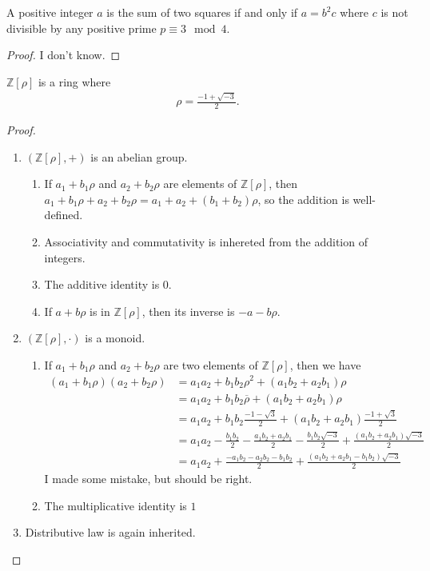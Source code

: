 \begin{example}
    A positive integer \(a\) is the sum of two squares if and only if \(a = b^2 c\) where \(c\) is not divisible by any positive prime \(p \equiv 3 \mod{4}\).
\end{example}
\begin{proof}
    I don't know.
\end{proof}

\begin{example}
    \(\mathbb{Z}[\rho]\) is a ring where
    \begin{align*}
        \rho = \frac{-1 + \sqrt{-3}}{2} \text{.}
    \end{align*}
\end{example}
\begin{proof}
    \begin{enumerate}
        \item \((\mathbb{Z}[\rho], +)\) is an abelian group.
        \begin{enumerate}
            \item If \(a_1 + b_1 \rho\) and \(a_2 + b_2 \rho\) are elements of \(\mathbb{Z}[\rho]\), then \(a_1 + b_1 \rho + a_2 + b_2 \rho = a_1 + a_2 + (b_1 + b_2) \rho\), so the addition is well-defined.
            \item Associativity and commutativity is inhereted from the addition of integers.
            \item The additive identity is \(0\).
            \item If \(a + b \rho\) is in \(\mathbb{Z}[\rho]\), then its inverse is \(-a - b \rho\).
        \end{enumerate}
        \item \((\mathbb{Z}[\rho], \cdot)\) is a monoid.
        \begin{enumerate}
            \item If \(a_1 + b_1 \rho\) and \(a_2 + b_2 \rho\) are two elements of \(\mathbb{Z}[\rho]\), then we have
            \begin{align*}
                (a_1 + b_1 \rho)(a_2 + b_2 \rho) &= a_1 a_2 + b_1 b_2 \rho^2 + (a_1 b_2 + a_2 b_1) \rho \\
                &= a_1 a_2 + b_1 b_2 \overline{\rho} + (a_1 b_2 + a_2 b_1) \rho \\
                &= a_1 a_2 + b_1 b_2 \frac{-1 - \sqrt{3}}{2} + (a_1 b_2 + a_2 b_1) \frac{-1 + \sqrt{3}}{2} \\
                &= a_1 a_2 - \frac{b_1 b_2}{2} - \frac{a_1 b_2 + a_2 b_1}{2} - \frac{b_1 b_2 \sqrt{-3}}{2} + \frac{(a_1 b_2 + a_2 b_1) \sqrt{-3}}{2} \\
                &= a_1 a_2 + \frac{-a_1 b_2 - a_2 b_2 -b_1 b_2}{2} + \frac{(a_1 b_2 + a_2 b_1 - b_1 b_2) \sqrt{-3}}{2}
            \end{align*}
            I made some mistake, but should be right.
            \item The multiplicative identity is \(1\)
        \end{enumerate}
        \item Distributive law is again inherited.
    \end{enumerate}
\end{proof}
